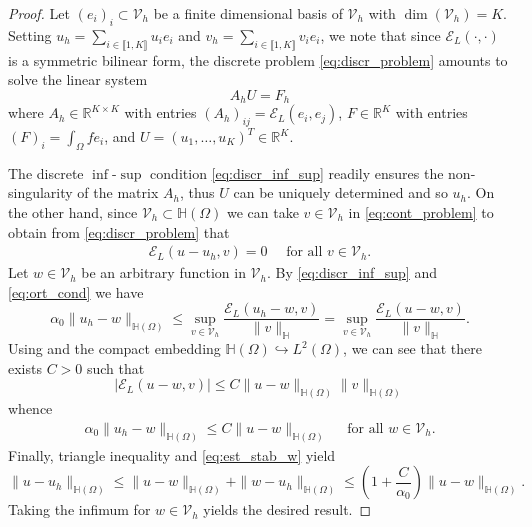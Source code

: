 \documentclass[10 pt]{article}
\newcommand\inter[1]{\llbracket #1\rrbracket}
\numberwithin{equation}{section}
\def\R{\mathbb{R}}
\def\cE{\mathcal{E}}
\begin{document}
\begin{proof}
Let $(e_i)_i\subset \mathcal V_h$ be a finite dimensional basis of $\mathcal V_h$ with $\dim(\mathcal V_h)=K$. Setting $u_h=\sum_{i\in\inter{1,K}}u_i e_i$ and $v_h=\sum_{i\in\inter{1,K}} v_i e_i$, we note that since $\cE_{L}(\cdot,\cdot)$ is a symmetric bilinear form, the discrete problem \eqref{eq:discr_problem} amounts to solve the linear system 
%
\begin{equation*}
    A_h U = F_h
\end{equation*}
%
where $A_h\in\mathbb R^{K\times K}$ with entries $(A_h)_{ij}=\cE_L(e_i,e_j)$, $F\in\R^{K}$ with entries $(F)_i=\int_{\Omega}f e_i$, and $U=(u_1,\ldots, u_K)^T\in \R^{K}$. 

The discrete $\inf$-$\sup$ condition \eqref{eq:discr_inf_sup} readily ensures the non-singularity of the matrix $A_h$, thus $U$ can be uniquely determined and so $u_h$. On the other hand, since $\mathcal V_h\subset \mathbb H(\Omega)$ we can take $v\in \mathcal V_h$ in \eqref{eq:cont_problem} to obtain from \eqref{eq:discr_problem} that
%
\begin{align}\label{eq:ort_cond}
    \cE_{L}(u-u_h,v)=0 \quad\text{ for all } v\in\mathcal V_h.
\end{align}
%
Let $w\in\mathcal V_h$ be an arbitrary function in $\mathcal V_h$. By \eqref{eq:discr_inf_sup} and \eqref{eq:ort_cond} we have
%
\begin{equation*}
    \alpha_0\|u_h-w\|_{\mathbb H(\Omega)} \leq \sup_{v\in\mathcal V_h}\frac{\cE_{L}(u_h-w,v)}{\|v\|_{\mathbb H}}=\sup_{v\in\mathcal V_h}\frac{\cE_{L}(u-w,v)}{\|v\|_{\mathbb H}}.
\end{equation*}
%
Using \cite[Lemma 3.4]{HSS22} and the compact embedding $\mathbb H(\Omega)\hookrightarrow L^2(\Omega)$, we can see that there exists $C>0$ such that
%
\begin{equation*}
    |\cE_{L}(u-w,v)|\leq C\|u-w\|_{\mathbb H(\Omega)}\|v\|_{\mathbb H(\Omega)}
\end{equation*}
%
whence
%
\begin{align}\label{eq:est_stab_w}
    \alpha_0\|u_h-w\|_{\mathbb H(\Omega)} \leq C\|u-w\|_{\mathbb H(\Omega)} \quad\text{ for all } w\in\mathcal V_h.
\end{align}
Finally, triangle inequality and \eqref{eq:est_stab_w} yield
%
\begin{equation*}
    \|u-u_h\|_{\mathbb H(\Omega)}\leq \|u-w\|_{\mathbb H(\Omega)}+\|w-u_h\|_{\mathbb H(\Omega)}\leq \left(1+\frac{C}{\alpha_0}\right)\|u-w\|_{\mathbb H(\Omega)}.
\end{equation*}
%
Taking the infimum for $w\in \mathcal V_h$ yields the desired result. 
\end{proof}
\end{document}

